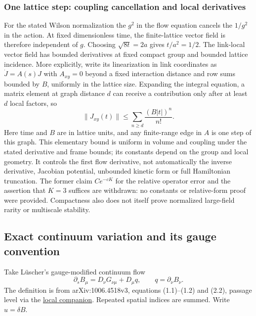 \documentclass[11pt,a4paper]{article}
\begin{document}
\hypertarget{one-lattice-step-coupling-cancellation-and-local-derivatives}{%
\subsubsection{One lattice step: coupling cancellation and local
derivatives}\label{one-lattice-step-coupling-cancellation-and-local-derivatives}}

For the stated Wilson normalization the \(g^2\) in the flow equation
cancels the \(1/g^2\) in the action. At fixed dimensionless time, the
finite-lattice vector field is therefore independent of \(g\). Choosing
\(\sqrt{8t}=2a\) gives \(t/a^2=1/2\). The link-local vector field has
bounded derivatives at fixed compact group and bounded lattice
incidence. More explicitly, write its linearization in link coordinates
as \(\dot J=A(s)J\) with \(A_{xy}=0\) beyond a fixed interaction
distance and row sums bounded by \(B\), uniformly in the lattice size.
Expanding the integral equation, a matrix element at graph distance
\(d\) can receive a contribution only after at least \(d\) local
factors, so \[\|J_{xy}(t)\|\le\sum_{n\ge d}\frac{(B|t|)^n}{n!}.\] Here
time and \(B\) are in lattice units, and any finite-range edge in \(A\)
is one step of this graph. This elementary bound is uniform in volume
and coupling under the stated derivative and frame bounds; its constants
depend on the group and local geometry. It controls the first flow
derivative, not automatically the inverse derivative, Jacobian
potential, unbounded kinetic form or full Hamiltonian truncation. The
former claim \(Ce^{-cK}\) for the relative operator error and the
assertion that \(K=3\) suffices are withdrawn: no constants or
relative-form proof were provided. Compactness also does not itself
prove normalized large-field rarity or multiscale stability.

\hypertarget{exact-continuum-variation-and-its-gauge-convention}{%
\subsection{Exact continuum variation and its gauge
convention}\label{exact-continuum-variation-and-its-gauge-convention}}

Take Lüscher's gauge-modified continuum flow
\[\partial_sB_\mu=D_\nu G_{\nu\mu}+D_\mu q,
\qquad q=\partial_\nu B_\nu.\] The definition is from arXiv:1006.4518v3,
equations (1.1)--(1.2) and (2.2), passage level via the
\href{../docs/Luscher_WilsonFlow_1006.4518v3.md}{local companion}.
Repeated spatial indices are summed. Write \(u=\delta B\).
\end{document}
